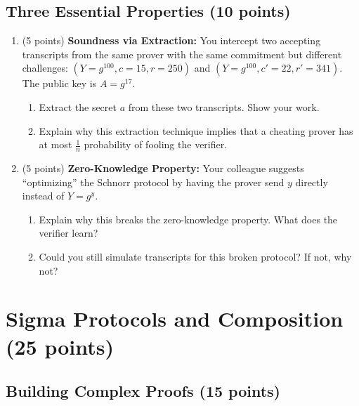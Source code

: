 \documentclass[10pt,a4paper,american]{article}
\begin{document}
\subsection{Three Essential Properties (10 points)}

\begin{enumerate}
	\item (5 points) \textbf{Soundness via Extraction:}
	      You intercept two accepting transcripts from the same prover with the same commitment but different challenges: $(Y = g^{100}, c = 15, r = 250)$ and $(Y = g^{100}, c' = 22, r' = 341)$. The public key is $A = g^{17}$.
	      \begin{enumerate}
		      \item Extract the secret $a$ from these two transcripts. Show your work.
		      \item Explain why this extraction technique implies that a cheating prover has at most $\frac{1}{n}$ probability of fooling the verifier.
	      \end{enumerate}
	\item (5 points) \textbf{Zero-Knowledge Property:}
	      Your colleague suggests ``optimizing'' the Schnorr protocol by having the prover send $y$ directly instead of $Y = g^y$.
	      \begin{enumerate}
		      \item Explain why this breaks the zero-knowledge property. What does the verifier learn?
		      \item Could you still simulate transcripts for this broken protocol? If not, why not?
	      \end{enumerate}
\end{enumerate}

\section{Sigma Protocols and Composition (25 points)}

\subsection{Building Complex Proofs (15 points)}
\end{document}
